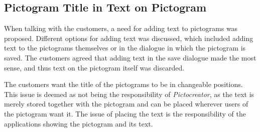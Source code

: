\subsection{Pictogram Title in Text on Pictogram}
When talking with the customers, a need for adding text to pictograms was proposed. 
Different options for adding text was discussed, which included adding text to the pictograms themselves or in the dialogue in which the pictogram is saved.
The customers agreed that adding text in the save dialogue made the most sense, and thus text on the pictogram itself was discarded.

The customers want the title of the pictograms to be in changeable positions. 
This issue is deemed as not being the responsibility of \textit{Pictocreator}, as the text is merely stored together with the pictogram and can be placed wherever users of the pictogram want it.
The issue of placing the text is the responsibility of the applications showing the pictogram and its text.